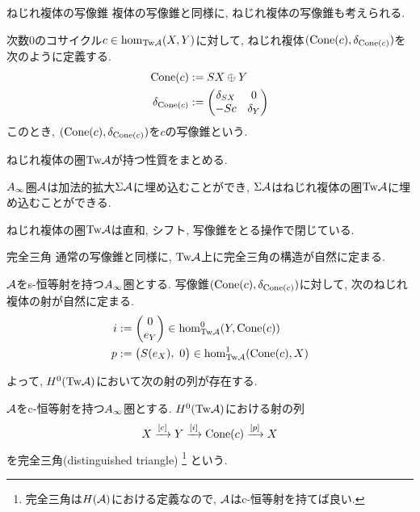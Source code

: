 \documentclass[aspectratio=169, dvipdfmx, 8pt, notheorems, uplatex]{beamer}
\begin{document}
\begin{frame}{ねじれ複体の写像錐}
  複体の写像錐と同様に, ねじれ複体の写像錐も考えられる. 

  \begin{definition}[写像錐]
    次数$0$のコサイクル$c \in \hom_{\mathrm{Tw}\mathcal{A}}(X,Y)$に対して, ねじれ複体$(\mathrm{Cone}(c),\delta_{\mathrm{Cone}(c)})$を次のように定義する. 
    \begin{align*}
      \mathrm{Cone}(c)
      &:= SX \oplus Y \\
      \delta_{\mathrm{Cone}(c)}
      &:= \begin{pmatrix}
        \delta_{SX} & 0 \\
        -Sc & \delta_{Y} 
      \end{pmatrix}
    \end{align*}
    このとき, $(\mathrm{Cone}(c),\delta_{\mathrm{Cone}(c)})$を$c$の写像錐という.
  \end{definition} 

  ねじれ複体の圏$\mathrm{Tw}\mathcal{A}$が持つ性質をまとめる.

  \begin{remark}
    $A_\infty$圏$\mathcal{A}$は加法的拡大$\Sigma\mathcal{A}$に埋め込むことができ, $\Sigma\mathcal{A}$はねじれ複体の圏$\mathrm{Tw}\mathcal{A}$に埋め込むことができる. 
  \end{remark}

  \begin{remark}
    ねじれ複体の圏$\mathrm{Tw}\mathcal{A}$は直和, シフト, 写像錐をとる操作で閉じている. 
  \end{remark}
\end{frame}

\begin{frame}{完全三角}
  通常の写像錐と同様に, $\mathrm{Tw}\mathcal{A}$上に完全三角の構造が自然に定まる.

  \begin{lemma}
    $\mathcal{A}$をs-恒等射を持つ$A_\infty$圏とする. 
    写像錐$(\mathrm{Cone}(c),\delta_{\mathrm{Cone}(c)})$に対して, 次のねじれ複体の射が自然に定まる.
    \begin{align*}
      i &:= \begin{pmatrix}
        0 \\ e_Y
      \end{pmatrix}
      \in \hom_{\mathrm{Tw}\mathcal{A}}^0(Y,\mathrm{Cone}(c)) \\
      p &:= \begin{pmatrix}
        S(e_X), ~0
      \end{pmatrix} 
      \in \hom_{\mathrm{Tw}\mathcal{A}}^1(\mathrm{Cone}(c), X)
    \end{align*}
  \end{lemma} 

  よって, $H^0(\mathrm{Tw}\mathcal{A})$において次の射の列が存在する. 

  \begin{definition}[完全三角]
    $\mathcal{A}$をc-恒等射を持つ$A_\infty$圏とする. 
    $H^0(\mathrm{Tw}\mathcal{A})$における射の列
    \begin{align*}
      X \xrightarrow{[c]} Y \xrightarrow{[i]} \mathrm{Cone}(c) \xrightarrow{[p]} X
    \end{align*}
    を完全三角(distinguished triangle)
    \footnote{
      完全三角は$H(\mathcal{A})$における定義なので, $\mathcal{A}$はc-恒等射を持てば良い. 
    }
    という. 
  \end{definition}

\end{frame}
\end{document}
